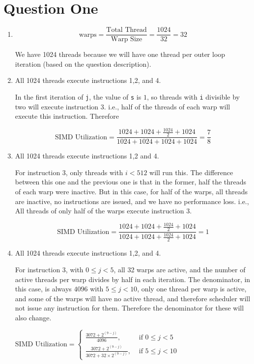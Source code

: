 \documentclass[12pt]{article}
\begin{document}
\section{Question One}

\begin{enumerate}[label=\alph*)]
	\item 
	$$\text{warps} = \frac{\text{Total Thread}}{\text{Warp Size}} = \frac{1024}{32} = 32 $$

We have 1024 threads because we will have one thread per outer loop iteration (based on the question description).


\item

All 1024 threads execute instructions 1,2, and 4.

In the first iteration of \verb+j+, the value of \Verb+s+ is $1$, so threads with \Verb+i+ divisible by two will execute instruction 3. i.e., half of the threads of each warp will execute this instruction. Therefore

$$\text{SIMD Utilization} = \frac{1024 + 1024 + \frac{1024}{2} + 1024}{1024+1024+1024+1024} = \frac{7}{8}$$

\item 
All 1024 threads execute instructions 1,2 and 4.

For instruction 3, only threads with $i<512$ will run this. The difference between this one and the previous one is that in the former, half the threads of each warp were inactive. But in this case, for half of the warps, all threads are inactive, no instructions are issued, and we have no performance loss. i.e., All threads of only half of the warps execute instruction 3.

$$\text{SIMD Utilization} = \frac{1024 + 1024 + \frac{1024}{2} + 1024}{1024+1024+\frac{1024}{2}+1024} = 1$$

\item

All 1024 threads execute instructions 1,2, and 4.

For instruction 3, with $0 \leq j <5$, all 32 warps are active, and the number of active threads per warp divides by half in each iteration. The denominator, in this case, is always $4096$ with $5 \leq j < 10$, only one thread per warp is active, and some of the warps will have no active thread, and therefore scheduler will not issue any instruction for them. Therefore the denominator for these will also change.


$\text{SIMD Utilization} = \begin{cases}\frac{3072+2^{(9-j)}}{4096}, & \text { if } 0 \leq j<5 \\ \frac{3072+2^{(9-j)}}{3072+32 \times 2^{(9-j)}}, & \text { if } 5 \leq j<10\end{cases}$



\end{enumerate}
\end{document}
